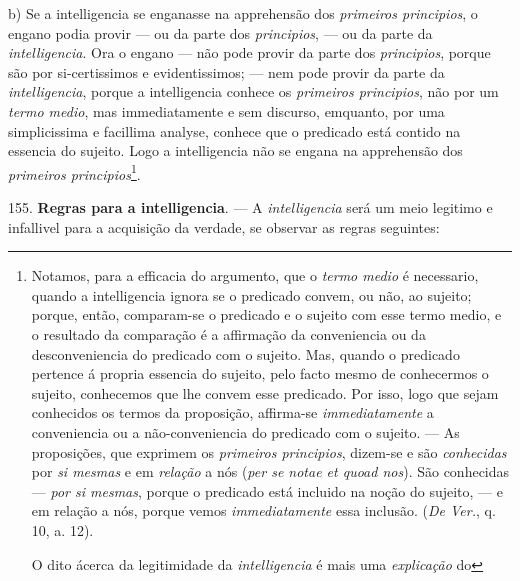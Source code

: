 b) Se a intelligencia se enganasse na apprehensão dos \emph{primeiros principios}, o engano podia provir --- ou da parte dos \emph{principios}, --- ou da parte da \emph{intelligencia}. Ora o engano --- não pode provir da parte dos \emph{principios}, porque são por si-certissimos e evidentissimos; --- nem pode provir da parte da \emph{intelligencia}, porque a intelligencia conhece os \emph{primeiros principios}, não por um \emph{termo medio}, mas immediatamente e sem discurso, emquanto, por uma simplicissima e facillima analyse, conhece que o predicado está contido na essencia do sujeito. Logo a intelligencia não se engana na apprehensão dos \emph{primeiros principios}\footnote{Notamos, para a efficacia do argumento, que o \emph{termo medio} é necessario, quando a intelligencia ignora se o predicado convem, ou não, ao sujeito; porque, então, comparam-se o predicado e o sujeito com esse termo medio, e o resultado da comparação é a affirmação da conveniencia ou da desconveniencia do predicado com o sujeito. Mas, quando o predicado pertence á propria essencia do sujeito, pelo facto mesmo de conhecermos o sujeito, conhecemos que lhe convem esse predicado. Por isso, logo que sejam conhecidos os termos da proposição, affirma-se \emph{immediatamente} a conveniencia ou a não-conveniencia do predicado com o sujeito. --- As proposições, que exprimem os \emph{primeiros principios}, dizem-se e são \emph{conhecidas} por \emph{si mesmas} e em \emph{relação} a nós (\emph{per se notae et quoad nos}). São conhecidas --- \emph{por si mesmas}, porque o predicado está incluido na noção do sujeito, --- e em relação a nós, porque vemos \emph{immediatamente} essa inclusão. (\emph{De Ver.}, q. 10, a. 12).\par O dito ácerca da legitimidade da \emph{intelligencia} é mais uma \emph{explicação} do}.

  155. \textbf{Regras para a intelligencia}. --- A \emph{intelligencia} será um meio legitimo e infallivel para a acquisição da verdade, se observar as regras seguintes:

